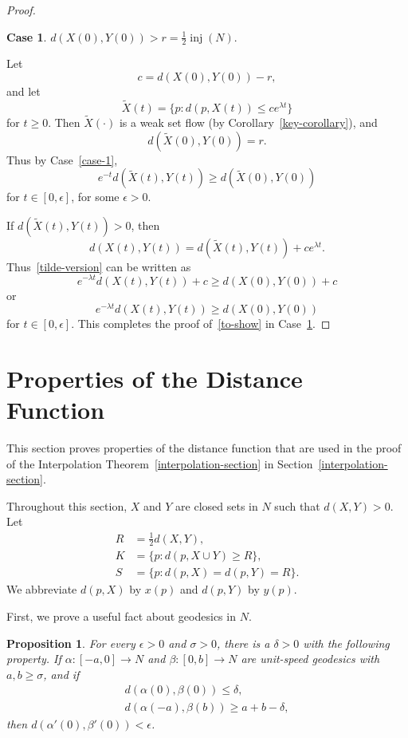 \documentclass{amsart}
\newcommand{\inj}{\operatorname{inj}}    %
\newcommand{\eps}{\epsilon}
\newtheorem{proposition}       [theorem]       {Proposition}
\theoremstyle{definition}
\theoremstyle{definition}
\newtheorem{case}   {Case}
\begin{document}
\begin{proof}
\begin{case}\label{case-2}   $d(X(0),Y(0)) > r = \frac12 \inj(N)$.
\end{case}

Let 
\[
    c= d(X(0),Y(0)) - r,
\]
and let
\[
\tilde X(t)= \{p: d(p,X(t)) \le ce^{\lambda t} \}
\]
for $t\ge 0$.   
Then $\tilde X(\cdot)$ is a weak set flow (by Corollary~\ref{key-corollary}),
and
\[
  d(\tilde X(0), Y(0)) = r.
\]
Thus by Case~\ref{case-1}, 
\begin{equation}\label{tilde-version}
    e^{-t}d(\tilde X(t), Y(t)) \ge d(\tilde X(0), Y(0))  
\end{equation}
for $t\in [0,\eps]$, for some $\eps>0$.

If $d(\tilde X(t),Y(t))>0$, then 
\[
   d(X(t),Y(t)) = d(\tilde X(t), Y(t)) + ce^{\lambda t}.
\]
Thus~\eqref{tilde-version} can be written as
\[
   e^{-\lambda t} d(X(t),Y(t)) + c \ge d(X(0),Y(0)) + c
\]
or
\[
   e^{-\lambda t}d(X(t),Y(t)) \ge d(X(0),Y(0))
\]
for $t\in [0,\eps]$.  This completes the proof of~\eqref{to-show} in Case~\ref{case-2}.
\end{proof}



\section{Properties of the Distance Function}\label{distance-section}
     
This section proves properties of the distance function that are used in the proof
of the Interpolation Theorem~\ref{interpolation-section} in Section~\ref{interpolation-section}.

Throughout this section,  $X$ and $Y$ are closed sets in $N$ such that $d(X,Y)>0$.
Let
\begin{align*}
R &= \frac12 d(X,Y), \\
K &= \{p: d(p,X\cup Y)\ge R\}, \\
S &= \{p: d(p,X)=d(p,Y) = R\}.
\end{align*}
We abbreviate $d(p,X)$ by $x(p)$ and $d(p,Y)$ by $y(p)$.

First, we prove a useful fact about geodesics in $N$.


\begin{proposition}\label{offset-proposition}
For every $\eps>0$ and $\sigma>0$, there is a $\delta>0$ with the following property.
If $\alpha:[-a,0]\to N$ and $\beta:[0,b]\to N$ are unit-speed
geodesics with $a,b\ge \sigma$, and if 
\begin{equation}\label{conditions}
\begin{gathered}
d(\alpha(0),\beta(0)) \le \delta, \\
d(\alpha(-a),\beta(b)) \ge a +b - \delta,
\end{gathered}
\end{equation}
then $d(\alpha'(0),\beta'(0))<\eps$.
\end{proposition}
\end{document}
